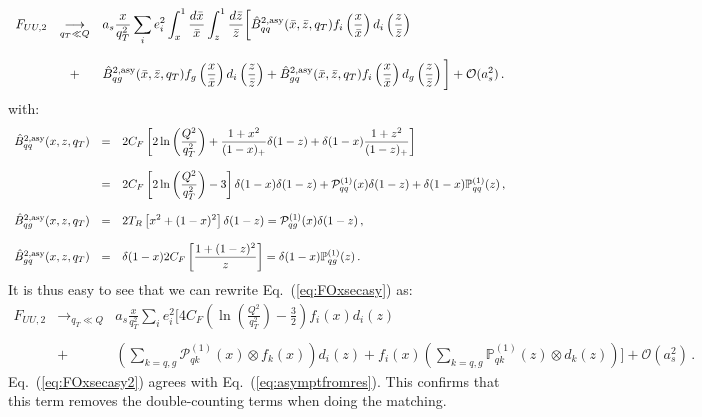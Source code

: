 \documentclass[10pt,a4paper]{article}
\begin{document}
\begin{equation}\label{eq:FOxsecasy}
\begin{array}{rcl}
  F_{UU,2}&\displaystyle \mathop{\longrightarrow}_{q_T\ll Q}&\displaystyle 
  a_s\frac{x}{q_T^2}\sum_{i}e_i^2\int_x^1\frac{d\bar{x}}{\bar{x}}\int_z^1\frac{d\bar{z}}{\bar{z}}\bigg[\hat{B}_{qq}^{2,
    \rm asy}(\bar{x},\bar{z},q_T)f_i\left(\frac{x}{\bar{x}}\right)
              d_i\left(\frac{z}{\bar{z}}\right)\\
\\
&+&\displaystyle \hat{B}_{qg}^{2,
    \rm asy}(\bar{x},\bar{z},q_T)f_g\left(\frac{x}{\bar{x}}\right)
              d_i\left(\frac{z}{\bar{z}}\right)+ \hat{B}_{gq}^{2,
    \rm asy}(\bar{x},\bar{z},q_T)f_i\left(\frac{x}{\bar{x}}\right)
              d_g\left(\frac{z}{\bar{z}}\right)\bigg]
+\mathcal{O}(a_s^2)\,.
\end{array}
\end{equation}
with:
\begin{equation}
\begin{array}{rcl}
  \hat{B}_{qq}^{2,\rm asy}(x,z,q_T) &=& \displaystyle  2C_F\left[2
                                        \ln\left(\frac{Q^2}{q_T^2}\right)+\frac{1+x^2}{(1-x)_+}\delta(1-z) +\delta(1-x)\frac{1+z^2}{(1-z)_+} \right]\\
  \\
                                    &=&\displaystyle 2C_F\left[2\ln\left(\frac{Q^2}{q_T^2}\right) -3\right]\delta(1-x) \delta(1-z)+\mathcal{P}_{qq}^{(1)}(x)\delta(1-z)
                                        +\delta(1-x) \mathbb{P}_{qq}^{(1)}(z)\,,\\
  \\
  \hat{B}_{qg}^{2,\rm asy}(x,z,q_T) &=& \displaystyle
                                        2T_R\left[x^2+(1-x)^2\right]\delta(1-z)=\mathcal{P}_{qg}^{(1)}(x)
                                        \delta(1-z)\,,\\
\\
  \hat{B}_{gq}^{2,\rm asy}(x,z,q_T) &=& \displaystyle  \delta(1-x)2C_F\left[\frac{1+(1-z)^2}{z}\right]=\delta(1-x)\mathbb{P}_{qg}^{(1)}(z)\,.
\end{array}
\end{equation}
It is thus easy to see that we can rewrite Eq.~(\ref{eq:FOxsecasy})
as:
\begin{equation}\label{eq:FOxsecasy2}
\begin{array}{rcl}
  F_{UU,2}&\displaystyle \mathop{\longrightarrow}_{q_T\ll Q}&\displaystyle 
  a_s\frac{x}{q_T^2}\sum_{i}e_i^2 \Bigg[4C_F\left(\ln\left(\frac{Q^2}{q_T^2}\right) -\frac{3}{2}\right) f_i\left(x\right)
              d_i\left(z\right)\\
\\
&+&\displaystyle
    \left(\sum_{k=q,g}\mathcal{P}^{(1)}_{qk}(x)\otimes f_k\left(x\right) \right)
              d_i\left(z\right)+ f_i\left(x\right)
              \left(\sum_{k=q,g}\mathbb{P}^{(1)}_{qk}(z) \otimes d_k\left(z\right)\right)\Bigg]
+\mathcal{O}(a_s^2)\,.
\end{array}
\end{equation}
Eq.~(\ref{eq:FOxsecasy2}) agrees with
Eq.~(\ref{eq:asymptfromres}). This confirms that this term removes the
double-counting terms when doing the matching.
\end{document}
